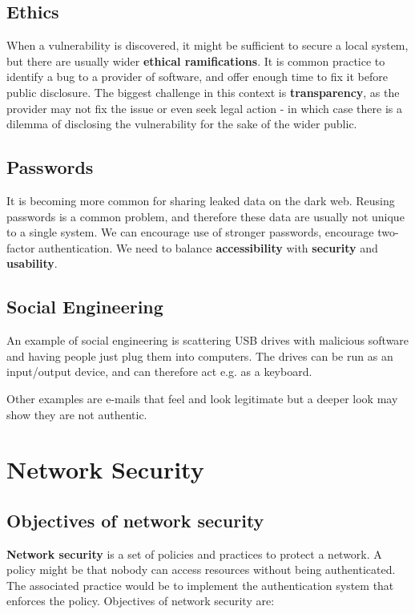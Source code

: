 \subsection{Ethics}

When a vulnerability is discovered, it might be sufficient to secure a local system, but there are usually wider \textbf{ethical ramifications}. It is common practice to identify a bug to a provider of software, and offer enough time to fix it before public disclosure. The biggest challenge in this context is \textbf{transparency}, as the provider may not fix the issue or even seek legal action - in which case there is a dilemma of disclosing the vulnerability for the sake of the wider public.

\subsection{Passwords}

It is becoming more common for sharing leaked data on the dark web. Reusing passwords is a common problem, and therefore these data are usually not unique to a single system. We can encourage use of stronger passwords, encourage two-factor authentication. We need to balance \textbf{accessibility} with \textbf{security} and \textbf{usability}.

\subsection{Social Engineering}

An example of social engineering is scattering USB drives with malicious software and having people just plug them into computers. The drives can be run as an input/output device, and can therefore act e.g. as a keyboard.

Other examples are e-mails that feel and look legitimate but a deeper look may show they are not authentic.


\section{Network Security}

\subsection{Objectives of network security}

\textbf{Network security} is a set of policies and practices to protect a network. A policy might be that nobody can access resources without being authenticated. The associated practice would be to implement the authentication system that enforces the policy. Objectives of network security are:

